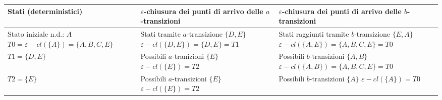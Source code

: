 \documentclass{standalone}
\providecommand\lightrule{%
	\arrayrulecolor{black!30}%
	\midrule[\lightrulewidth]%
	\arrayrulecolor{black}}
\begin{document}
\begin{tabularx}{\textwidth}{X|X|X}
		Stati (deterministici) & \(\varepsilon\)-chiusura dei punti di arrivo delle \(a\)-transizioni & \(\varepsilon\)-chiusura dei punti di arrivo delle \(b\)-transizioni \\
    \midrule
        Stato iniziale n.d.: \(A\) \newline
        \(T0 = \varepsilon-cl(\{A\}) = \{A, B, C, E\}\)
        &
        Stati tramite \(a\)-transizione \(\{D,E\}\) \newline
        \(\varepsilon-cl(\{D,E\}) = \{D,E\} = T1\) \newline
        [T1 unmarked]
        &
        Stati raggiunti tramite \(b\)-transizione \(\{E, A\}\) \newline
        \(\varepsilon-cl(\{A,E\}) = \{A,B,C,E\} = T0\) 
        \\ \lightrule
        \(T1 = \{D,E\}\)
        &
        Possibili \(a\)-tranizioni \(\{E\}\) \newline
        \(\varepsilon-cl(\{E\}) = T2\) \newline
        [T2 unmarked]
        &
        Possibili \(b\)-transizioni \(\{A,B\}\) \newline
        \(\varepsilon-cl(\{A,B\}) = \{A, B, C, E\} = T0\) 
        \\ \lightrule
        \(T2 = \{E\}\)
        &
        Possibili \(a\)-transizioni \(\{E\}\)
        \(\varepsilon-cl(\{E\}) = T2\)
        &
        Possibili \(b\)-transizioni \(\{A\}\)
        \(\varepsilon-cl(\{A\}) = T0\)
        \\
\end{tabularx}
\end{document}
